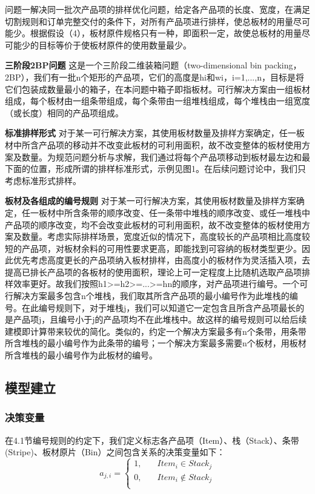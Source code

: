 \documentclass[bwprint]{gmcmthesis}
\begin{document}
问题一解决同一批次产品项的排样优化问题，给定各产品项的长度、宽度，在满足切割规则和订单完整交付的条件下，对所有产品项进行排样，使总板材的用量尽可能少。根据假设（4），板材原件规格只有一种，即面积一定，故使总板材的用量尽可能少的目标等价于使板材原件的使用数量最少。

\textbf{三阶段2BP问题} \quad 这是一个三阶段二维装箱问题（two-dimensional bin packing，2BP），我们有一批n个矩形的产品项，它们的高度是hi和wi，i=1,...,n，目标是将它们包装成数量最小的箱子，在本问题中箱子即指板材。可行解决方案由一组板材组成，每个板材由一组条带组成，每个条带由一组堆栈组成，每个堆栈由一组宽度（或长度）相同的产品项组成。

\textbf{标准排样形式} \quad 对于某一可行解决方案，其使用板材数量及排样方案确定，任一板材中所含产品项的移动并不改变此板材的可利用面积，故不改变整体的板材使用方案及数量。为规范问题分析与求解，我们通过将每个产品项移动到板材最左边和最下面的位置，形成所谓的排样标准形式，示例见图1。在后续问题讨论中，我们只考虑标准形式排样。

\textbf{板材及各组成的编号规则} \quad 对于某一可行解决方案，其使用板材数量及排样方案确定，任一板材中所含条带的顺序改变、任一条带中堆栈的顺序改变、或任一堆栈中产品项的顺序改变，均不会改变此板材的可利用面积，故不改变整体的板材使用方案及数量。考虑实际排样场景，宽度近似的情况下，高度较长的产品项相比高度较短的产品项，对板材余料的可用性要求更高，即能找到可容纳的板材类型更少。因此优先考虑高度更长的产品项纳入板材排样，由高度小的板材作为灵活插入项，去提高已排长产品项的各板材的使用面积，理论上可一定程度上比随机选取产品项排样效率更好。故我们按照h1>=h2>=...>=hn的顺序，对产品项进行编号。一个可行解决方案最多包含n个堆栈，我们取其所含产品项的最小编号作为此堆栈的编号。在此编号规则下，对于堆栈j，我们可以知道它一定包含且所含产品项最长的是产品项j，且编号小于j的产品项均不在此堆栈中。故这样的编号规则可以给后续建模即计算带来较优的简化。类似的，约定一个解决方案最多有n个条带，用条带所含堆栈的最小编号作为此条带的编号；一个解决方案最多需要n个板材，用板材所含堆栈的最小编号作为此板材的编号。


\subsection{模型建立}

\subsubsection{决策变量}
在4.1节编号规则的约定下，我们定义标志各产品项（Item）、栈（Stack）、条带(Stripe)、板材原片（Bin）之间包含关系的决策变量如下：
\begin{equation}   %
    a_{j,i}=
    \begin{cases}
        1, \quad  & Item_i \in  Stack_j \\
        0,\quad  & Item_i  \notin  Stack_j \\
    \end{cases}
\end{equation}
\end{document}

